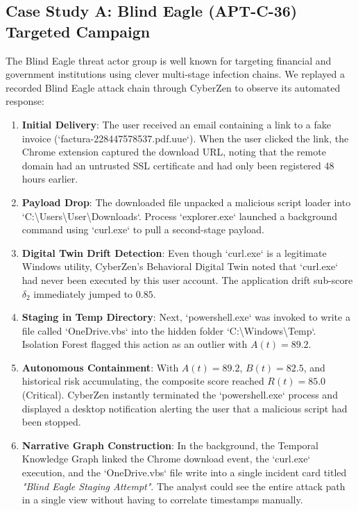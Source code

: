 \documentclass[conference]{IEEEtran}
\begin{document}
\subsection{Case Study A: Blind Eagle (APT-C-36) Targeted Campaign}
The Blind Eagle threat actor group is well known for targeting financial and government institutions using clever multi-stage infection chains. We replayed a recorded Blind Eagle attack chain through CyberZen to observe its automated response:
\begin{enumerate}
    \item \textbf{Initial Delivery}: The user received an email containing a link to a fake invoice (`factura-228447578537.pdf.uue`). When the user clicked the link, the Chrome extension captured the download URL, noting that the remote domain had an untrusted SSL certificate and had only been registered 48 hours earlier.
    \item \textbf{Payload Drop}: The downloaded file unpacked a malicious script loader into `C:\textbackslash Users\textbackslash User\textbackslash Downloads`. Process `explorer.exe` launched a background command using `curl.exe` to pull a second-stage payload.
    \item \textbf{Digital Twin Drift Detection}: Even though `curl.exe` is a legitimate Windows utility, CyberZen's Behavioral Digital Twin noted that `curl.exe` had never been executed by this user account. The application drift sub-score $\delta_2$ immediately jumped to $0.85$.
    \item \textbf{Staging in Temp Directory}: Next, `powershell.exe` was invoked to write a file called `OneDrive.vbs` into the hidden folder `C:\textbackslash Windows\textbackslash Temp`. Isolation Forest flagged this action as an outlier with $A(t) = 89.2$.
    \item \textbf{Autonomous Containment}: With $A(t) = 89.2$, $B(t) = 82.5$, and historical risk accumulating, the composite score reached $R(t) = 85.0$ (Critical). CyberZen instantly terminated the `powershell.exe` process and displayed a desktop notification alerting the user that a malicious script had been stopped.
    \item \textbf{Narrative Graph Construction}: In the background, the Temporal Knowledge Graph linked the Chrome download event, the `curl.exe` execution, and the `OneDrive.vbs` file write into a single incident card titled \textit{"Blind Eagle Staging Attempt"}. The analyst could see the entire attack path in a single view without having to correlate timestamps manually.
\end{enumerate}
\end{document}
